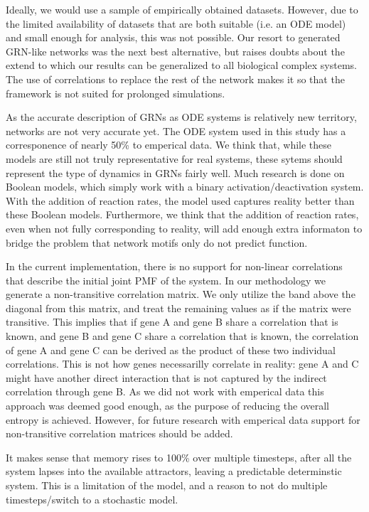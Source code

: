 \documentclass[../main.tex]{subfiles}
\begin{document}
Ideally, we would use a sample of empirically obtained datasets.
However, due to the limited availability of datasets that are both suitable (i.e. an ODE model) and small enough for analysis, this was not possible.
Our resort to generated GRN-like networks was the next best alternative, but raises doubts about the extend to which our results can be generalized to all biological complex systems.
The use of correlations to replace the rest of the network makes it so that the framework is not suited for prolonged simulations.

As the accurate description of GRNs as ODE systems is relatively new territory, networks are not very accurate yet.
The ODE system used in this study has a corresponence of nearly 50\% to emperical data.
We think that, while these models are still not truly representative for real systems, these sytems should represent the type of dynamics in GRNs fairly well.
Much research is done on Boolean models, which simply work with a binary activation/deactivation system.
With the addition of reaction rates, the model used captures reality better than these Boolean models.
Furthermore, we think that the addition of reaction rates, even when not fully corresponding to reality, will add enough extra informaton to bridge the problem that network motifs only do not predict function.

In the current implementation, there is no support for non-linear correlations that describe the initial joint PMF of the system.
In our methodology we generate a non-transitive correlation matrix.
We only utilize the band above the diagonal from this matrix, and treat the remaining values as if the matrix were transitive.
This implies that if gene A and gene B share a correlation that is known, and gene B and gene C share a correlation that is known, the correlation of gene A and gene C can be derived as the product of these two individual correlations.
This is not how genes necessarilly correlate in reality: gene A and C might have another direct interaction that is not captured by the indirect correlation through gene B.
As we did not work with emperical data this approach was deemed good enough, as the purpose of reducing the overall entropy is achieved.
However, for future research with emperical data support for non-transitive correlation matrices should be added.


It makes sense that memory  rises to 100\% over multiple timesteps, after all the system lapses into the available attractors, leaving a predictable determinstic system.
This is a limitation of the model, and a reason to not do multiple timesteps/switch to a stochastic model.
\end{document}

